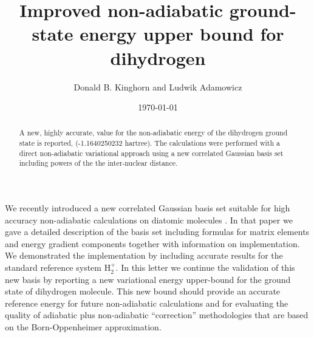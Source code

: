 

\linespread{1.6}



\draft

\title{Improved non-adiabatic ground-state energy upper bound for dihydrogen}
\author{Donald B. Kinghorn and Ludwik Adamowicz}
\address{ Department of Chemistry\\
        University of Arizona\\
        Tucson AZ 85721}
\date{\today}
\maketitle

\begin{abstract}
A new, highly accurate, value for the non-adiabatic energy 
of the dihydrogen ground state is reported, (-1.1640250232 hartree).
The calculations were performed with a direct non-adiabatic variational
approach using a new correlated {G}aussian basis set including powers of the
the inter-nuclear distance. 
\end{abstract}



We recently introduced a new correlated Gaussian basis set suitable
for high accuracy non-adiabatic calculations on diatomic molecules
\cite{Kinghorn99a}.
In that paper we gave a detailed description of the basis set including
formulas for matrix elements and energy gradient components together with 
information on implementation. We demonstrated the implementation by
including accurate results for the standard reference system H$_{2}^{+}$.
In this letter we continue the validation of this new basis by reporting
a new variational energy upper-bound for the ground state of dihydrogen 
molecule. This new bound should provide an accurate reference energy
for future non-adiabatic calculations and for evaluating the quality
of adiabatic plus non-adiabatic ``correction'' methodologies
that are based on the Born-Oppenheimer approximation. 

